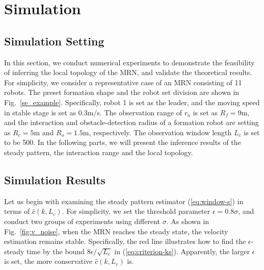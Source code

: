 \documentclass[12pt,journal,draftclsnofoot,onecolumn]{IEEEtran}
\begin{document}
\section{Simulation}\label{simulation}
\subsection{Simulation Setting}
In this section, we conduct numerical experiments to demonstrate the feasibility of inferring the local topology of the MRN, and validate the theoretical results. 
For simplicity, we consider a representative case of an MRN consisting of 11 robots. 
The preset formation shape and the robot set division are shown in Fig.~\ref{se_example}. 
Specifically, robot 1 is set as the leader, and the moving speed in stable stage is set as 0.3m$/$s. 
The observation range of $r_a$ is set as $R_f=9$m, and the interaction and obstacle-detection radius of a formation robot are setting as $R_c=5$m and $R_o=1.5$m, respectively. 
The observation window length $L_c$ is set to be 500. 
In the following parts, we will present the inference results of the steady pattern, the interaction range and the local topology. 




\subsection{Simulation Results}
Let us begin with examining the steady pattern estimator (\ref{eq:window-s}) in terms of $\hat c(k,L_c)$. 
For simplicity, we set the threshold parameter $\epsilon=0.8\sigma$, and conduct two groups of experiments using different $\sigma$. 
As shown in Fig.~\ref{fig:v_noise}, when the MRN reaches the steady state, the velocity estimation remains stable. 
Specifically, the red line illustrates how to find the $\epsilon$-steady time by the bound ${8\epsilon}/{\sqrt{L_c}}$ in (\ref{eq:criterion-ks}). 
Apparently, the larger $\epsilon$ is set, the more conservative $\hat c(k,L_c)$ is. 
\end{document}
